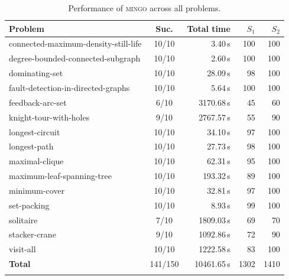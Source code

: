 \begin{table}[htbp]
\centering
\caption{Performance of \textsc{mingo} across all problems.}
\label{tab:performance-mingo}
\begin{tabular}{lcrrr}
\toprule
Problem & Suc. & Total time & $S_1$ & $S_2$ \\
\midrule
connected-maximum-density-still-life & 10/10 & 3.40\,s & 100 & 100 \\
degree-bounded-connected-subgraph & 10/10 & 2.60\,s & 100 & 100 \\
dominating-set & 10/10 & 28.09\,s & 98 & 100 \\
fault-detection-in-directed-graphs & 10/10 & 5.64\,s & 100 & 100 \\
feedback-arc-set & 6/10 & 3170.68\,s & 45 & 60 \\
knight-tour-with-holes & 9/10 & 2767.57\,s & 55 & 90 \\
longest-circuit & 10/10 & 34.10\,s & 97 & 100 \\
longest-path & 10/10 & 27.73\,s & 98 & 100 \\
maximal-clique & 10/10 & 62.31\,s & 95 & 100 \\
maximum-leaf-spanning-tree & 10/10 & 193.32\,s & 89 & 100 \\
minimum-cover & 10/10 & 32.81\,s & 97 & 100 \\
set-packing & 10/10 & 8.93\,s & 99 & 100 \\
solitaire & 7/10 & 1809.03\,s & 69 & 70 \\
stacker-crane & 9/10 & 1092.86\,s & 72 & 90 \\
visit-all & 10/10 & 1222.58\,s & 83 & 100 \\
\midrule
\textbf{Total} & 141/150 & 10461.65\,s & 1302 & 1410 \\
\botrule
\end{tabular}
\end{table}

